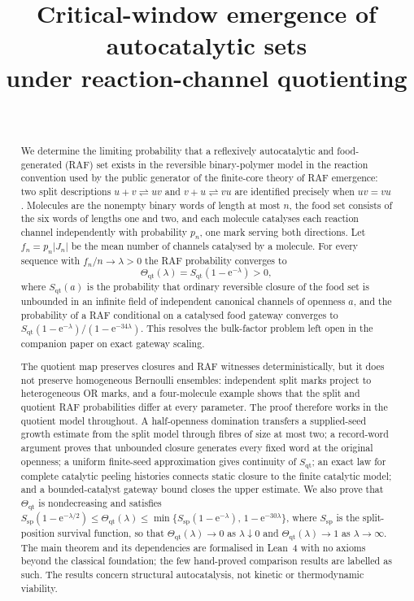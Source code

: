 \documentclass[11pt,a4paper]{article}
\title{Critical-window emergence of autocatalytic sets\\ under reaction-channel quotienting}
\author{\PaperAuthor\\ \PaperAffiliation}
\date{\PaperDate}
\theoremstyle{plain}
\theoremstyle{definition}
\theoremstyle{remark}
\newcommand{\qt}{\mathrm{qt}}
\newcommand{\spc}{\mathrm{sp}}
\newcommand{\ee}{\mathrm{e}}
\begin{document}
\maketitle

\begin{abstract}
We determine the limiting probability that a reflexively autocatalytic and food-generated (RAF) set exists in the reversible binary-polymer model in the reaction convention used by the public generator of the finite-core theory of RAF emergence: two split descriptions $u+v\rightleftharpoons uv$ and $v+u\rightleftharpoons vu$ are identified precisely when $uv=vu$. Molecules are the nonempty binary words of length at most $n$, the food set consists of the six words of lengths one and two, and each molecule catalyses each reaction channel independently with probability $p_n$, one mark serving both directions. Let $f_n=p_n|J_n|$ be the mean number of channels catalysed by a molecule. For every sequence with $f_n/n\to\lambda>0$ the RAF probability converges to
\[
\Theta_{\qt}(\lambda)=S_{\qt}(1-\ee^{-\lambda})>0,
\]
where $S_{\qt}(a)$ is the probability that ordinary reversible closure of the food set is unbounded in an infinite field of independent canonical channels of openness $a$, and the probability of a RAF conditional on a catalysed food gateway converges to $S_{\qt}(1-\ee^{-\lambda})/(1-\ee^{-34\lambda})$. This resolves the bulk-factor problem left open in the companion paper on exact gateway scaling.

The quotient map preserves closures and RAF witnesses deterministically, but it does not preserve homogeneous Bernoulli ensembles: independent split marks project to heterogeneous OR marks, and a four-molecule example shows that the split and quotient RAF probabilities differ at every parameter. The proof therefore works in the quotient model throughout. A half-openness domination transfers a supplied-seed growth estimate from the split model through fibres of size at most two; a record-word argument proves that unbounded closure generates every fixed word at the original openness; a uniform finite-seed approximation gives continuity of $S_{\qt}$; an exact law for complete catalytic peeling histories connects static closure to the finite catalytic model; and a bounded-catalyst gateway bound closes the upper estimate. We also prove that $\Theta_{\qt}$ is nondecreasing and satisfies $S_{\spc}(1-\ee^{-\lambda/2})\le\Theta_{\qt}(\lambda)\le\min\{S_{\spc}(1-\ee^{-\lambda}),\,1-\ee^{-30\lambda}\}$, where $S_{\spc}$ is the split-position survival function, so that $\Theta_{\qt}(\lambda)\to0$ as $\lambda\downarrow0$ and $\Theta_{\qt}(\lambda)\to1$ as $\lambda\to\infty$. The main theorem and its dependencies are formalised in Lean~4 with no axioms beyond the classical foundation; the few hand-proved comparison results are labelled as such. The results concern structural autocatalysis, not kinetic or thermodynamic viability.
\end{abstract}
\end{document}
